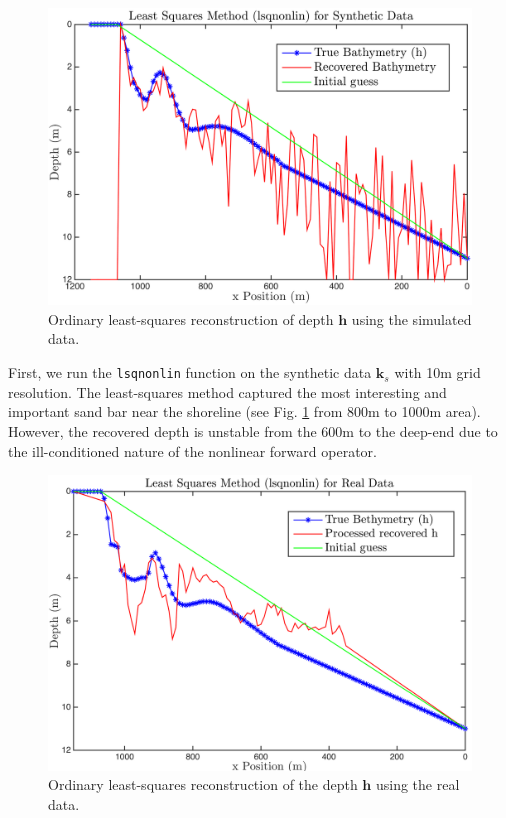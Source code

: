 \begin{figure}[H]
\center
\includegraphics[scale=0.6]{img/lsqnonlin_simulated_10m.png} %
\caption{Ordinary least-squares reconstruction of depth $\mathbf{h}$ using the simulated data.}
\label{lsqnonlin_simulated}
\end{figure}
First, we run the \verb|lsqnonlin| function on the synthetic data $\mathbf{k}_s$ with 10m grid resolution. The least-squares method captured the most interesting and important sand bar near the shoreline (see Fig. \ref{lsqnonlin_simulated} from 800m to 1000m area). However, the recovered depth is unstable from the 600m to the deep-end due to the ill-conditioned nature of the nonlinear forward operator. 

\begin{figure}[H]
\center
\includegraphics[scale=0.6]{img/lsqnonlin_real_data_oct09.png} %
\caption{Ordinary least-squares reconstruction of the depth $\mathbf{h}$ using the real data.}
\label{lsqnonlin_real}
\end{figure}

